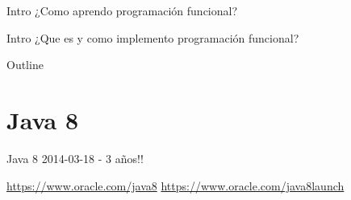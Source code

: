 \documentclass[14pt]{beamer}
\begin{document}
\begin{frame}{Intro}
    \huge ¿Como aprendo programación funcional?
\end{frame}

\begin{frame}{Intro}
    \huge ¿Que es y como implemento programación funcional?
\end{frame}

 \begin{frame}{Outline}
    \tableofcontents
\end{frame}

\section{Java 8}
\begin{frame}{Java 8}
    2014-03-18 - 3 años!!
    
\href{https://www.oracle.com/java8}{https://www.oracle.com/java8}
\href{https://www.oracle.com/java8launch}{https://www.oracle.com/java8launch}
\end{frame}
\end{document}
